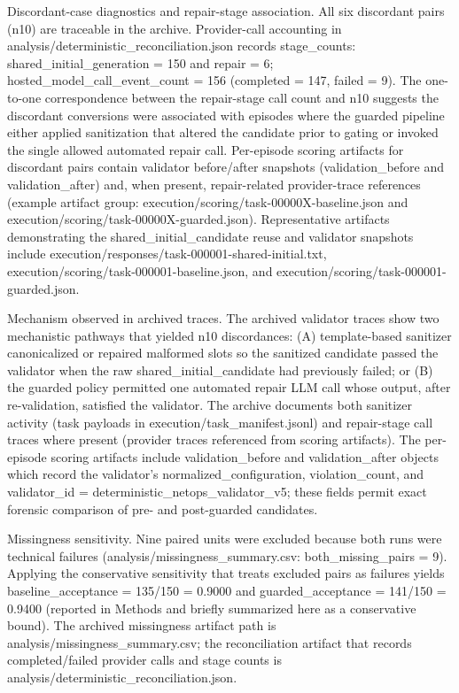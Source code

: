 \documentclass[conference]{IEEEtran}
\begin{document}
Discordant-case diagnostics and repair-stage association. All six discordant pairs (n10) are traceable in the archive. Provider-call accounting in analysis/deterministic\_reconciliation.json records stage\_counts: shared\_initial\_generation = 150 and repair = 6; hosted\_model\_call\_event\_count = 156 (completed = 147, failed = 9). The one-to-one correspondence between the repair-stage call count and n10 suggests the discordant conversions were associated with episodes where the guarded pipeline either applied sanitization that altered the candidate prior to gating or invoked the single allowed automated repair call. Per-episode scoring artifacts for discordant pairs contain validator before/after snapshots (validation\_before and validation\_after) and, when present, repair-related provider-trace references (example artifact group: execution/scoring/task-00000X-baseline.json and execution/scoring/task-00000X-guarded.json). Representative artifacts demonstrating the shared\_initial\_candidate reuse and validator snapshots include execution/responses/task-000001-shared-initial.txt, execution/scoring/task-000001-baseline.json, and execution/scoring/task-000001-guarded.json.

Mechanism observed in archived traces. The archived validator traces show two mechanistic pathways that yielded n10 discordances: (A) template-based sanitizer canonicalized or repaired malformed slots so the sanitized candidate passed the validator when the raw shared\_initial\_candidate had previously failed; or (B) the guarded policy permitted one automated repair LLM call whose output, after re-validation, satisfied the validator. The archive documents both sanitizer activity (task payloads in execution/task\_manifest.jsonl) and repair-stage call traces where present (provider traces referenced from scoring artifacts). The per-episode scoring artifacts include validation\_before and validation\_after objects which record the validator's normalized\_configuration, violation\_count, and validator\_id = deterministic\_netops\_validator\_v5; these fields permit exact forensic comparison of pre- and post-guarded candidates.

Missingness sensitivity. Nine paired units were excluded because both runs were technical failures (analysis/missingness\_summary.csv: both\_missing\_pairs = 9). Applying the conservative sensitivity that treats excluded pairs as failures yields baseline\_acceptance = 135/150 = 0.9000 and guarded\_acceptance = 141/150 = 0.9400 (reported in Methods and briefly summarized here as a conservative bound). The archived missingness artifact path is analysis/missingness\_summary.csv; the reconciliation artifact that records completed/failed provider calls and stage counts is analysis/deterministic\_reconciliation.json.
\end{document}
